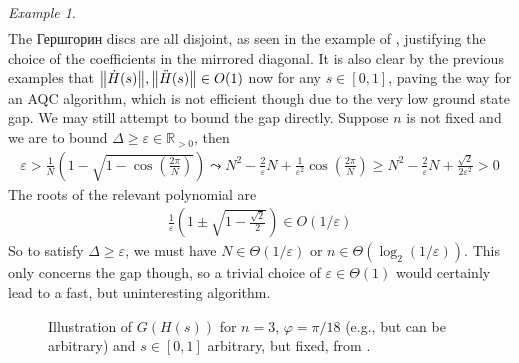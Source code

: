 \documentclass[10pt]{amsart}
\theoremstyle{definition}
\theoremstyle{remark}
\newtheorem{example}[theorem]{Example}
\begin{document}
\begin{example}
\begin{align}
        \end{align}
        The Гершгорин discs are all disjoint, as seen in the example of , justifying the choice of the coefficients in the mirrored diagonal. It is also clear by the previous examples that \(\norm{\dot{H}(s)}, \norm{\ddot{H}(s)} \in O(1)\) now for any \(s \in [0, 1]\), paving the way for an AQC algorithm, which is not efficient though due to the very low ground state gap. We may still attempt to bound the gap directly. Suppose \(n\) is not fixed and we are to bound \(\Delta \geq \varepsilon \in \mathbb{R}_{> 0}\), then
        \begin{align}
            \varepsilon > \frac{1}{N}\left(1-\sqrt{1-\cos\left(\frac{2\pi}{N}\right)}\right) \leadsto N^2-\frac{2}{\varepsilon}N+\frac{1}{\varepsilon^2}\cos\left(\frac{2\pi}{N}\right) \geq N^2-\frac{2}{\varepsilon}N+\frac{\sqrt{2}}{2\varepsilon^2} > 0
        \end{align}
        The roots of the relevant polynomial are
        \begin{align}
            \frac{1}{\varepsilon}\left(1\pm\sqrt{1-\frac{\sqrt{2}}{2}}\right) \in O(1/\varepsilon)
        \end{align}
        So to satisfy \(\Delta \geq \varepsilon\), we must have \(N \in \Theta(1/\varepsilon)\) or \(n \in \Theta(\log_2(1/\varepsilon))\). This only concerns the gap though, so a trivial choice of \(\varepsilon \in \Theta(1)\) would certainly lead to a fast, but uninteresting algorithm.

        \begin{figure}[!hbtp]
            \caption{Illustration of \(G(H(s))\) for \(n = 3\), \(\varphi = \pi/18\) (e.g., but can be arbitrary) and \(s \in [0, 1]\) arbitrary, but fixed, from .}
            \label{phase_approx_example_illustration}
        \end{figure}
    \end{example}

    \printbibliography{}
\end{document}
